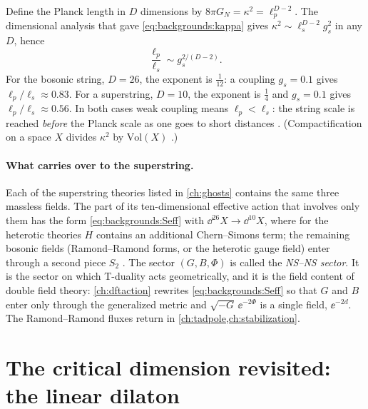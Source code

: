 \begin{example}\label{ex:backgrounds:planck}
Define the Planck length in $D$ dimensions by $8\pi G_N=\kappa^2=\ell_p^{D-2}$. The
dimensional analysis that gave \eqref{eq:backgrounds:kappa} gives
$\kappa^2\sim\ell_s^{D-2}g_s^2$ in any $D$, hence
\[
  \frac{\ell_p}{\ell_s}\sim g_s^{2/(D-2)} .
\]
For the bosonic string, $D=26$, the exponent is $\tfrac1{12}$: a coupling $g_s=0.1$ gives
$\ell_p/\ell_s\approx0.83$. For a superstring, $D=10$, the exponent is $\tfrac14$ and
$g_s=0.1$ gives $\ell_p/\ell_s\approx0.56$. In both cases weak coupling means
$\ell_p<\ell_s$: the string scale is reached \emph{before} the Planck scale as one goes to
short distances . (Compactification on a space $X$ divides $\kappa^2$ by $\mathrm{Vol}(X)$
.)
\end{example}

\paragraph{What carries over to the superstring.}
Each of the superstring theories listed in \cref{ch:ghosts} contains the same three massless
fields. The part of its ten-dimensional effective action that involves only them has the
form \eqref{eq:backgrounds:Seff} with $\dd^{26}X\to\dd^{10}X$, where for the heterotic
theories $H$ contains an additional Chern--Simons term; the remaining bosonic fields
(Ramond--Ramond forms, or the heterotic gauge field) enter through a second piece $S_2$
. \TL{} The sector $(G,B,\Phi)$ is called the
\emph{NS--NS sector}. It is the sector on which T-duality acts
geometrically, and it is the field content of double field theory: \cref{ch:dftaction}
rewrites \eqref{eq:backgrounds:Seff} so that $G$ and $B$ enter only through the generalized
metric and $\sqrt{-G}\,\ee^{-2\Phi}$ is a single field, $\ee^{-2d}$. The Ramond--Ramond
fluxes return in \cref{ch:tadpole,ch:stabilization}.

\section{The critical dimension revisited: the linear dilaton}\label{sec:backgrounds:critical}

